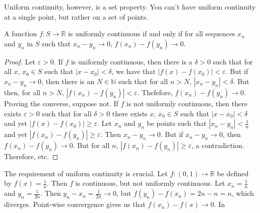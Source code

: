 \documentclass[crop=false,class=book,oneside]{standalone}
\begin{document}
            Uniform continuity, however, is a set property. You can't
            have uniform continuity at a single point, but rather on
            a set of points.
            \begin{theorem}
                \label{thm:Funct:equiv_def_of_uni_cont}
                A function $f:S\rightarrow\mathbb{R}$
                is uniformly continuous if and only if
                for all sequences $x_{n}$ and $y_{n}$ in
                $S$ such that $x_{n}-y_{n}\rightarrow{0}$,
                $f(x_{n})-f(y_{n})\rightarrow{0}$.
            \end{theorem}
            \begin{proof}
                Let $\varepsilon>0$. If $f$ is uniformly continuous,
                then there is a $\delta>0$ such that for all
                $x$, $x_{0}\in{S}$ such that $|x-x_{0}|<\delta$,
                we have that $|f(x)-f(x_{0})|<\varepsilon$. But if
                $x_{n}-y_{n}\rightarrow{0}$, then there is an
                $N\in\mathbb{N}$ such that for all $n>N$,
                $|x_{n}-y_{n}|<\delta$. But then, for all $n>N$,
                $|f(x_{n})-f(y_{n})|<\varepsilon$. Thefefore,
                $f(x_{n})-f(y_{n})\rightarrow{0}$. Proving the
                converse, suppose not. If $f$ is not uniformly
                continuous, then there exists $\varepsilon>0$
                such that for all $\delta>0$ there exists
                $x$, $x_{0}\in{S}$ such that
                $|x-x_{0}|<\delta$ and yet
                $|f(x)-f(x_{0})|\geq{\varepsilon}$. Let
                $x_{n}$ and $y_{n}$ be points such that
                $|x_{n}-y_{n}|<\frac{1}{n}$ and yet
                $|f(x_{n})-f(y_{n})|\geq\varepsilon$. Then
                $x_{n}-y_{n}\rightarrow{0}$. But if
                $x_{n}-y_{n}\rightarrow{0}$, then
                $f(x_{n})-f(y_{n})\rightarrow{0}$. But for all
                $n$, $|f(x_{n})-f(y_{n})|\geq{\varepsilon}$,
                a contradiction. Therefore, etc.
            \end{proof}
            The requirement of uniform continuity is crucial.
            Let $f:(0,1)\rightarrow\mathbb{R}$ be defined by
            $f(x)=\frac{1}{x}$. Then $f$ is continuous, but
            not uniformly continuous. Let $x_{n}=\frac{1}{n}$
            and $y_{n}=\frac{1}{2n}$. Then
            $y_{n}-x_{n}=\frac{1}{2n}\rightarrow{0}$, but
            $f(y_{n})-f(x_{n})=2n-n=n$, which diverges.
            Point-wise convergence gives us that
            $f(x_{n})-f(x)\rightarrow{0}$. In
\end{document}
